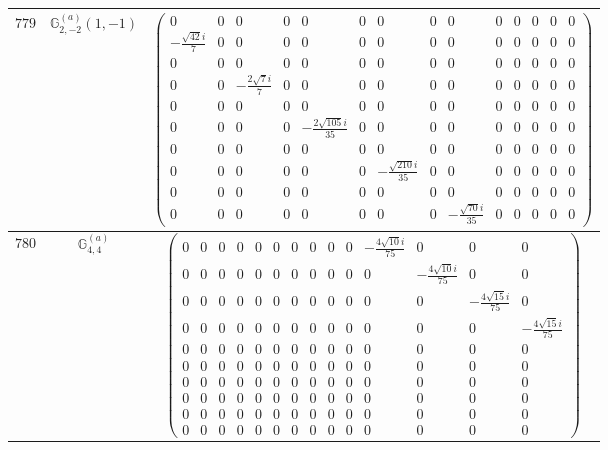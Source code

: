 \documentclass[fleqn,8pt,landscape]{jsarticle}
\begin{document}
\begin{center}
\begin{longtable}{ccc}
$ 779 $ & $ \mathbb{G}_{2,-2}^{(a)}(1,-1) $ & $ \begin{pmatrix} 0 & 0 & 0 & 0 & 0 & 0 & 0 & 0 & 0 & 0 & 0 & 0 & 0 & 0 \\ - \frac{\sqrt{42} i}{7} & 0 & 0 & 0 & 0 & 0 & 0 & 0 & 0 & 0 & 0 & 0 & 0 & 0 \\ 0 & 0 & 0 & 0 & 0 & 0 & 0 & 0 & 0 & 0 & 0 & 0 & 0 & 0 \\ 0 & 0 & - \frac{2 \sqrt{7} i}{7} & 0 & 0 & 0 & 0 & 0 & 0 & 0 & 0 & 0 & 0 & 0 \\ 0 & 0 & 0 & 0 & 0 & 0 & 0 & 0 & 0 & 0 & 0 & 0 & 0 & 0 \\ 0 & 0 & 0 & 0 & - \frac{2 \sqrt{105} i}{35} & 0 & 0 & 0 & 0 & 0 & 0 & 0 & 0 & 0 \\ 0 & 0 & 0 & 0 & 0 & 0 & 0 & 0 & 0 & 0 & 0 & 0 & 0 & 0 \\ 0 & 0 & 0 & 0 & 0 & 0 & - \frac{\sqrt{210} i}{35} & 0 & 0 & 0 & 0 & 0 & 0 & 0 \\ 0 & 0 & 0 & 0 & 0 & 0 & 0 & 0 & 0 & 0 & 0 & 0 & 0 & 0 \\ 0 & 0 & 0 & 0 & 0 & 0 & 0 & 0 & - \frac{\sqrt{70} i}{35} & 0 & 0 & 0 & 0 & 0 \end{pmatrix} $ \\ \hline
$ 780 $ & $ \mathbb{G}_{4,4}^{(a)} $ & $ \begin{pmatrix} 0 & 0 & 0 & 0 & 0 & 0 & 0 & 0 & 0 & 0 & - \frac{4 \sqrt{10} i}{75} & 0 & 0 & 0 \\ 0 & 0 & 0 & 0 & 0 & 0 & 0 & 0 & 0 & 0 & 0 & - \frac{4 \sqrt{10} i}{75} & 0 & 0 \\ 0 & 0 & 0 & 0 & 0 & 0 & 0 & 0 & 0 & 0 & 0 & 0 & - \frac{4 \sqrt{15} i}{75} & 0 \\ 0 & 0 & 0 & 0 & 0 & 0 & 0 & 0 & 0 & 0 & 0 & 0 & 0 & - \frac{4 \sqrt{15} i}{75} \\ 0 & 0 & 0 & 0 & 0 & 0 & 0 & 0 & 0 & 0 & 0 & 0 & 0 & 0 \\ 0 & 0 & 0 & 0 & 0 & 0 & 0 & 0 & 0 & 0 & 0 & 0 & 0 & 0 \\ 0 & 0 & 0 & 0 & 0 & 0 & 0 & 0 & 0 & 0 & 0 & 0 & 0 & 0 \\ 0 & 0 & 0 & 0 & 0 & 0 & 0 & 0 & 0 & 0 & 0 & 0 & 0 & 0 \\ 0 & 0 & 0 & 0 & 0 & 0 & 0 & 0 & 0 & 0 & 0 & 0 & 0 & 0 \\ 0 & 0 & 0 & 0 & 0 & 0 & 0 & 0 & 0 & 0 & 0 & 0 & 0 & 0 \end{pmatrix} $ \\ \hline

\end{longtable}
\end{center}
\end{document}

